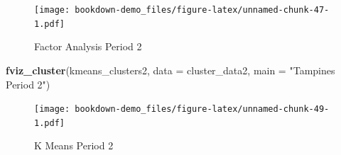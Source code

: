 \documentclass[]{book}
\newenvironment{Shaded}{\begin{snugshade}}{\end{snugshade}}
\newcommand{\KeywordTok}[1]{\textcolor[rgb]{0.13,0.29,0.53}{\textbf{#1}}}
\newcommand{\DataTypeTok}[1]{\textcolor[rgb]{0.13,0.29,0.53}{#1}}
\newcommand{\DecValTok}[1]{\textcolor[rgb]{0.00,0.00,0.81}{#1}}
\newcommand{\StringTok}[1]{\textcolor[rgb]{0.31,0.60,0.02}{#1}}
\newcommand{\OperatorTok}[1]{\textcolor[rgb]{0.81,0.36,0.00}{\textbf{#1}}}
\newcommand{\NormalTok}[1]{#1}
\begin{document}
\begin{Shaded}
\end{Shaded}

\begin{Shaded}
\end{Shaded}

\begin{figure}
\centering
\texttt{[image: bookdown-demo\_files/figure-latex/unnamed-chunk-47-1.pdf]}
\caption{\label{fig:unnamed-chunk-47}\label{fig:figs}Factor Analysis Period
2}
\end{figure}

\begin{Shaded}
\begin{Highlighting}[]
\KeywordTok{fviz_cluster}\NormalTok{(kmeans_clusters2, }\DataTypeTok{data =}\NormalTok{ cluster_data2, }\DataTypeTok{main =} \StringTok{"Tampines Period 2"}\NormalTok{)}
\end{Highlighting}
\end{Shaded}

\begin{figure}
\centering
\texttt{[image: bookdown-demo\_files/figure-latex/unnamed-chunk-49-1.pdf]}
\caption{\label{fig:unnamed-chunk-49}\label{fig:figs}K Means Period 2}
\end{figure}
\end{document}
